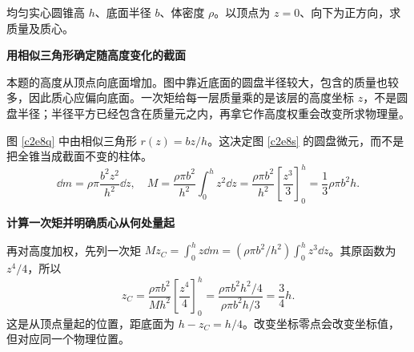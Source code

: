 \begin{question}
\begin{example}[圆锥的质量与质心]
均匀实心圆锥高 $h$、底面半径 $b$、体密度 $\rho$。以顶点为 $z=0$、向下为正方向，求质量及质心。
\end{example}
\end{question}
\begin{solution}\textbf{用相似三角形确定随高度变化的截面}\par\nobreak
本题的高度从顶点向底面增加。图中靠近底面的圆盘半径较大，包含的质量也较多，因此质心应偏向底面。一次矩给每一层质量乘的是该层的高度坐标 $z$，不是圆盘半径；半径平方已经包含在质量元之内，再拿它作高度权重会改变所求物理量。

图 \ref{c2e8q} 中由相似三角形 $r(z)=bz/h$。这决定图 \ref{c2e8s} 的圆盘微元，而不是把全锥当成截面不变的柱体。
\[
 \dd m=\rho\pi\frac{b^2z^2}{h^2}\dd z,\quad
 M=\frac{\rho\pi b^2}{h^2}\int_0^h z^2\dd z
 =\frac{\rho\pi b^2}{h^2}\left[\frac{z^3}{3}\right]_0^h
 =\frac13\rho\pi b^2h.
\]


\par\medskip{}\noindent\textbf{计算一次矩并明确质心从何处量起}\par\nobreak
再对高度加权，先列一次矩 $Mz_C=\int_0^h z\dd m=(\rho\pi b^2/h^2)\int_0^h z^3\dd z$。其原函数为 $z^4/4$，所以
\[
 z_C=\frac{\rho\pi b^2}{Mh^2}\left[\frac{z^4}{4}\right]_0^h
 =\frac{\rho\pi b^2h^2/4}{\rho\pi b^2h/3}
 =\boxed{\frac34h}.
\]
这是从顶点量起的位置，距底面为 $h-z_C=h/4$。改变坐标零点会改变坐标值，但对应同一个物理位置。
\end{solution}

